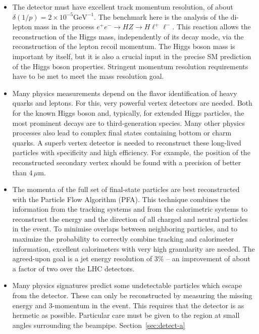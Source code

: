 \documentclass[%
 reprint,
 amsmath,amssymb,
 aps,
]{revtex4-1}
\def\ee{e^+e^-}
\begin{document}
 
\begin{itemize}
 \item The detector must have excellent track momentum
   resolution, of about $\delta(1/p)=2 \times 10^{-5} \mathrm{GeV}^{-1}$. 
The benchmark  here is the analysis 
of the di-lepton mass in the process $\ee \to HZ \to H \ell^+
\ell^-$. This reaction allows the reconstruction of the 
Higgs mass,  independently of its decay mode,  via the 
reconstruction of the lepton recoil momentum. The Higgs boson mass is
important by itself, but it is also a crucial input in the precise SM
prediction of the Higgs boson properties.  Stringent momentum resolution requirements have to be met
to meet the mass resolution goal. 
\item Many physics measurements depend on the flavor  identification of heavy
  quarks
and leptons.  For this, very powerful vertex detectors 
are needed. Both for the known Higgs boson and, typically, for 
extended Higgs particles, the most prominent decays are to
third-generation
species.   Many other physics processes also lead to 
complex  final states containing  bottom or charm quarks.
A superb  vertex detector  is needed to reconstruct these 
long-lived particles with specificity and high efficiency.
 For example, the position of the reconstructed secondary
 vertex
 should be found with a precision of better than $4\,\mu$m.
\item The momenta of the full set of final-state particles are
 best reconstructed with the 
Particle Flow Algorithm (PFA).
 This  technique combines 
the information from the tracking systems and from the 
calorimetric systems to reconstruct the 
energy and the direction of all charged and 
neutral particles in the event. To minimise overlaps between 
neighboring particles, and to 
maximize the probability to 
correctly combine tracking and calorimeter information, 
excellent calorimeters with very high granularity  are needed.
The agreed-upon goal is  a jet energy resolution of $3 \%$ -- an
improvement of about a 
factor of two over the LHC detectors. 
\item Many physics signatures predict some undetectable particles
which escape from the detector. These  can only be reconstructed by 
measuring the missing energy and 3-momentum  in the event. This requires 
that the detector is as hermetic as possible. 
Particular care must be given to the region at small angles surrounding the 
beampipe. Section~\ref{sec:detect-a}
\end{itemize}
\end{document}
